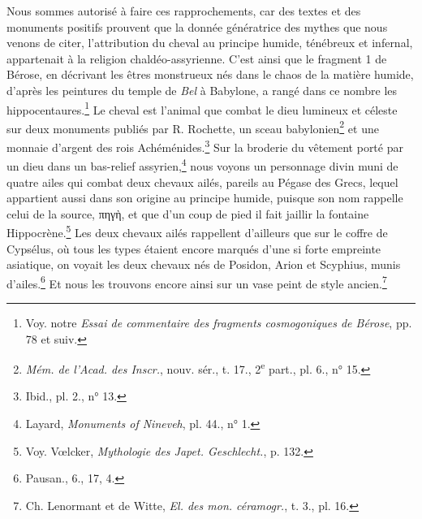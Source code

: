 \documentclass[a4paper, 11pt, oneside]{article}
\begin{document}
Nous sommes autorisé à faire ces rapprochements, car des textes et des monuments positifs prouvent que la donnée génératrice des mythes que nous venons de citer, l'attribution du cheval au principe humide, ténébreux et infernal, appartenait à la religion chaldéo-assyrienne. C'est ainsi que le fragment 1 de Bérose, en décrivant les êtres monstrueux nés dans le chaos de la matière humide, d'après les peintures du temple de \emph{Bel} à Babylone, a rangé dans ce nombre les hippocentaures.\footnote{Voy. notre \emph{Essai de commentaire des fragments cosmogoniques de Bérose}, pp. 78 et suiv.} Le cheval est l'animal que combat le dieu lumineux et céleste sur deux monuments publiés par R. Rochette, un sceau babylonien\footnote{\emph{Mém. de l'Acad. des Inscr.}, nouv. sér., t. 17., 2\textsuperscript{e} part., pl. 6., n° 15.} et une monnaie d'argent des rois Achéménides.\footnote{Ibid., pl. 2., n° 13.} Sur la broderie du vêtement porté par un dieu dans un bas-relief assyrien,\footnote{Layard, \emph{Monuments of Nineveh}, pl. 44., n° 1.} nous voyons un personnage divin muni de quatre ailes qui combat deux chevaux ailés, pareils au Pégase des Grecs, lequel appartient aussi dans son origine au principe humide, puisque son nom rappelle celui de la source, πηγὴ, et que d'un coup de pied il fait jaillir la fontaine Hippocrène.\footnote{Voy. Vœlcker, \emph{Mythologie des Japet. Geschlecht.}, p. 132.} Les deux chevaux ailés rappellent d'ailleurs que sur le coffre de Cypsélus, où tous les types étaient encore marqués d'une si forte empreinte asiatique, on voyait les deux chevaux nés de Posidon, Arion et Scyphius, munis d'ailes.\footnote{Pausan., 6., 17, 4.} Et nous les trouvons encore ainsi sur un vase peint de style ancien.\footnote{Ch. Lenormant et de Witte, \emph{El. des mon. céramogr.}, t. 3., pl. 16.}
\end{document}
